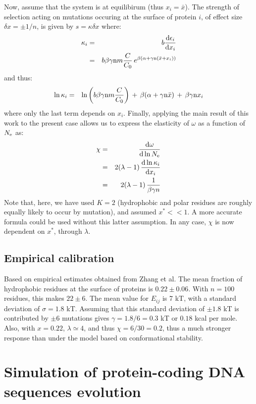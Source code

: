 \documentclass{article}
\begin{document}
Now, assume that the system is at equilibirum (thus $x_i = \bar x$). The strength of selection acting on mutations occuring at the surface of protein $i$, of effect size $\delta x = \pm 1/n$, is given by $s = \kappa \delta x$ where:
\begin{eqnarray}
\kappa_i &=& b \frac{\mathrm{d}\epsilon_i} {\mathrm{d} x_i} 
\\ &=&
b \beta \gamma \text{n} m \frac{C}{C_0} \, e^{\beta (\alpha +\gamma \text{n} (\bar x + x_i))}
\end{eqnarray}
and thus:
\begin{eqnarray}
\ln \kappa_i &=& \ln \left( b \beta \gamma \text{n} m \frac{C}{C_0}  \right) \, + \, \beta (\alpha +\gamma \text{n} \bar x) \, + \, \beta \gamma\text{n} x_i
\end{eqnarray}
where only the last term depends on $x_i$.
Finally, applying the main result of this work to the present case allows us to express the elasticity of $\omega$ as a function of $N_{\mathrm{e}}$ as:
\begin{eqnarray}
\chi &=& \frac{\mathrm{d}\omega} {\mathrm{d} \ln N_{\mathrm{e}}} 
\\ &=&  2(\lambda - 1) \, \frac{\mathrm{d}\ln \kappa_i}{\mathrm{d} x_i} 
\\ &=&  2 (\lambda - 1) \, \frac{1}{\beta \gamma n}
\end{eqnarray}
Note that, here, we have used $K=2$ (hydrophobic and polar residues are roughly equally likely to occur by mutation), and assumed $x^* << 1$. A more accurate formula could be used without this latter assumption. In any case, $\chi$ is now dependent on $x^*$, through $\lambda$.

\subsection{Empirical calibration}

Based on empirical estimates obtained from Zhang et al. The mean fraction of hydrophobic residues at the surface of proteins is $0.22 \pm 0.06$. With $n=100$ residues, this makes $22 \pm 6$. The mean value for $E_{ij}$ is 7 kT, with a standard deviation of $\sigma = 1.8$ kT. Assuming that this standard deviation of $\pm 1.8$ kT is contributed by $\pm 6$ mutations gives $\gamma = 1.8 / 6 = 0.3$ kT or $0.18$ kcal per mole. Also, with $x=0.22$, $\lambda \simeq 4$, and thus $\chi = 6  / 30 = 0.2$, thus a much stronger response than under the model based on conformational stability.


\section{Simulation of protein-coding DNA sequences evolution}
\end{document}
